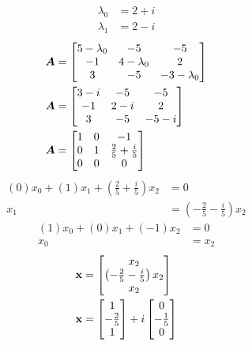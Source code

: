\documentclass{article}
\begin{document}
\begin{align*}
	\lambda_0 & = 2 + i \\
	\lambda_1 & = 2 - i
\end{align*}
\begin{align*}
	\bm{A} & = \begin{bmatrix}
		5 - \lambda_0 & -5 & -5 \\
		-1 & 4 - \lambda_0 & 2 \\
		3 & -5 & -3 - \lambda_0
	\end{bmatrix} \\
	\bm{A} & = \begin{bmatrix}
		3 - i & -5 & -5 \\
		-1 & 2 - i & 2 \\
		3 & -5 & -5 - i
	\end{bmatrix} \\
	\bm{A} & = \begin{bmatrix}
		1 & 0 & -1 \\
		0 & 1 & \frac{2}{5} + \frac{i}{5} \\
		0 & 0 & 0
	\end{bmatrix}
\end{align*}
\begin{align*}
	(0)x_0 + (1)x_1 + \left( \frac{2}{5} + \frac{i}{5} \right)x_2 & = 0 \\
	x_1 & = \left( - \frac{2}{5} - \frac{i}{5} \right)x_2
\end{align*}
\begin{align*}
	(1)x_0 + (0)x_1 + (-1)x_2 & = 0 \\
	x_0 & = x_2
\end{align*}
\begin{align*}
	\mathbf{x} & = \begin{bmatrix} x_2 \\ \left( - \frac{2}{5} - \frac{i}{5} \right)x_2 \\ x_2 \end{bmatrix} \\
	\mathbf{x} & = \begin{bmatrix} 1 \\ -\frac{2}{5} \\ 1 \end{bmatrix} + i\begin{bmatrix} 0 \\ -\frac{1}{5} \\ 0 \end{bmatrix}
\end{align*}
\end{document}
